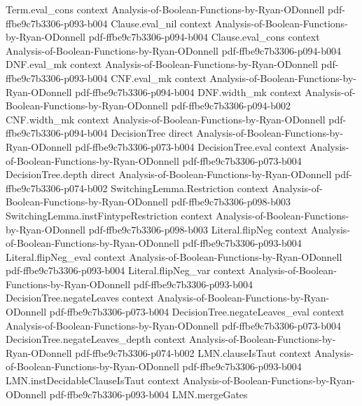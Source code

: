 \begin{theorem}
\proofstep
  {Term.eval_cons}
  {context}
  {Analysis-of-Boolean-Functions-by-Ryan-ODonnell}
  {pdf-ffbe9c7b3306-p093-b004}
\proofstep
  {Clause.eval_nil}
  {context}
  {Analysis-of-Boolean-Functions-by-Ryan-ODonnell}
  {pdf-ffbe9c7b3306-p094-b004}
\proofstep
  {Clause.eval_cons}
  {context}
  {Analysis-of-Boolean-Functions-by-Ryan-ODonnell}
  {pdf-ffbe9c7b3306-p094-b004}
\proofstep
  {DNF.eval_mk}
  {context}
  {Analysis-of-Boolean-Functions-by-Ryan-ODonnell}
  {pdf-ffbe9c7b3306-p093-b004}
\proofstep
  {CNF.eval_mk}
  {context}
  {Analysis-of-Boolean-Functions-by-Ryan-ODonnell}
  {pdf-ffbe9c7b3306-p094-b004}
\proofstep
  {DNF.width_mk}
  {context}
  {Analysis-of-Boolean-Functions-by-Ryan-ODonnell}
  {pdf-ffbe9c7b3306-p094-b002}
\proofstep
  {CNF.width_mk}
  {context}
  {Analysis-of-Boolean-Functions-by-Ryan-ODonnell}
  {pdf-ffbe9c7b3306-p094-b004}
\proofstep
  {DecisionTree}
  {direct}
  {Analysis-of-Boolean-Functions-by-Ryan-ODonnell}
  {pdf-ffbe9c7b3306-p073-b004}
\proofstep
  {DecisionTree.eval}
  {context}
  {Analysis-of-Boolean-Functions-by-Ryan-ODonnell}
  {pdf-ffbe9c7b3306-p073-b004}
\proofstep
  {DecisionTree.depth}
  {direct}
  {Analysis-of-Boolean-Functions-by-Ryan-ODonnell}
  {pdf-ffbe9c7b3306-p074-b002}
\proofstep
  {SwitchingLemma.Restriction}
  {context}
  {Analysis-of-Boolean-Functions-by-Ryan-ODonnell}
  {pdf-ffbe9c7b3306-p098-b003}
\proofstep
  {SwitchingLemma.instFintypeRestriction}
  {context}
  {Analysis-of-Boolean-Functions-by-Ryan-ODonnell}
  {pdf-ffbe9c7b3306-p098-b003}
\proofstep
  {Literal.flipNeg}
  {context}
  {Analysis-of-Boolean-Functions-by-Ryan-ODonnell}
  {pdf-ffbe9c7b3306-p093-b004}
\proofstep
  {Literal.flipNeg_eval}
  {context}
  {Analysis-of-Boolean-Functions-by-Ryan-ODonnell}
  {pdf-ffbe9c7b3306-p093-b004}
\proofstep
  {Literal.flipNeg_var}
  {context}
  {Analysis-of-Boolean-Functions-by-Ryan-ODonnell}
  {pdf-ffbe9c7b3306-p093-b004}
\proofstep
  {DecisionTree.negateLeaves}
  {context}
  {Analysis-of-Boolean-Functions-by-Ryan-ODonnell}
  {pdf-ffbe9c7b3306-p073-b004}
\proofstep
  {DecisionTree.negateLeaves_eval}
  {context}
  {Analysis-of-Boolean-Functions-by-Ryan-ODonnell}
  {pdf-ffbe9c7b3306-p073-b004}
\proofstep
  {DecisionTree.negateLeaves_depth}
  {context}
  {Analysis-of-Boolean-Functions-by-Ryan-ODonnell}
  {pdf-ffbe9c7b3306-p074-b002}
\proofstep
  {LMN.clauseIsTaut}
  {context}
  {Analysis-of-Boolean-Functions-by-Ryan-ODonnell}
  {pdf-ffbe9c7b3306-p093-b004}
\proofstep
  {LMN.instDecidableClauseIsTaut}
  {context}
  {Analysis-of-Boolean-Functions-by-Ryan-ODonnell}
  {pdf-ffbe9c7b3306-p093-b004}
\proofstep
  {LMN.mergeGates}

\end{theorem}
